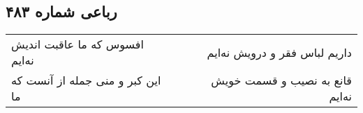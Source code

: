 \begin{center}
\section*{رباعی شماره ۴۸۳}
\label{sec:sh483}
\begin{longtable}{l p{0.5cm} r}
افسوس که ما عاقبت اندیش نه‌ایم
&&
داریم لباس فقر و درویش نه‌ایم
\\
این کبر و منی جمله از آنست که ما
&&
قانع به نصیب و قسمت خویش نه‌ایم
\\
\end{longtable}
\end{center}
